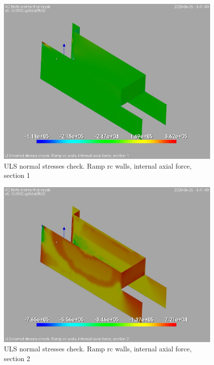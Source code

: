 \begin{figure}
\begin{center}
\includegraphics[width=\linewidth]{ramp_wall/resLC/text/graphics/normStrsULS/wallsNSect1}
\caption{ULS normal stresses check. Ramp rc walls, internal axial force, section 1}
\end{center}
\end{figure}
\begin{figure}
\begin{center}
\includegraphics[width=\linewidth]{ramp_wall/resLC/text/graphics/normStrsULS/wallsNSect2}
\caption{ULS normal stresses check. Ramp rc walls, internal axial force, section 2}
\end{center}
\end{figure}
